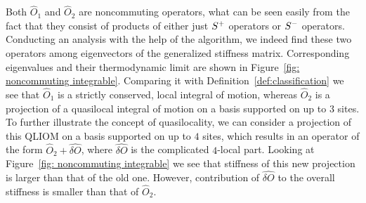Both \(\hat{O}_1\) and \(\hat{O}_2\) are noncommuting operators, what can be seen easily from the
fact that they consist of products of either just \(S^{+}\) operators or \(S^{-}\) operators. Conducting
an analysis with the help of the algorithm, we indeed find these two operators among eigenvectors
of the generalized stiffness matrix. Corresponding eigenvalues and their thermodynamic limit
are shown in Figure~\ref{fig: noncommuting integrable}. Comparing it with 
Definition~\ref{def:classification} we see that \(\hat{O}_1\) is a strictly 
conserved, local integral of motion, whereas \(\hat{O}_2\) is a projection 
of a quasilocal integral of motion on a basis supported on up to \(3\) sites.
To further illustrate the concept of quasilocality, we can consider a projection
of this QLIOM on a basis supported on up to \(4\) sites, which results in an operator of the form 
\(\hat{O}_2 + \hat{\delta O}\), where \(\hat{\delta O}\) is the complicated \(4\)-local part.
Looking at Figure~\ref{fig: noncommuting integrable} we see
that stiffness of this new projection is larger than that of the old one. However, contribution 
of \(\hat{\delta O}\) to the overall stiffness is smaller than that of \(\hat{O}_2\).
